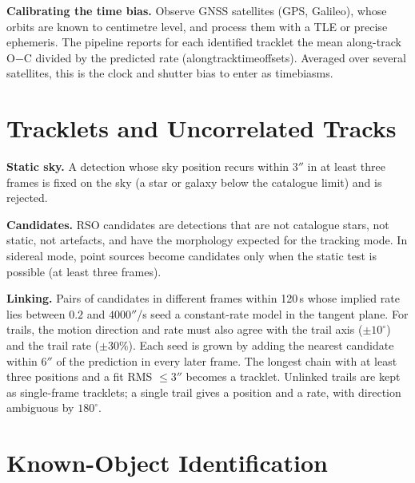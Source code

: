 \documentclass[11pt,a4paper]{article}
\newcommand{\brkus}{\textunderscore\allowbreak}
\newcommand{\code}[1]{{\ttfamily\let\_\brkus #1}}
\begin{document}
\begin{notebox}
\textbf{Calibrating the time bias.} Observe GNSS satellites (GPS, Galileo), whose orbits are
known to centimetre level, and process them with a TLE or precise ephemeris. The pipeline
reports for each identified tracklet the mean along-track O$-$C divided by the predicted rate
(\code{along\_track\_time\_offset\_s}). Averaged over several satellites, this is the clock and
shutter bias to enter as \code{time\_bias\_ms}.
\end{notebox}

\section{Tracklets and Uncorrelated Tracks}

\textbf{Static sky.} A detection whose sky position recurs within $3''$ in at least three frames
is fixed on the sky (a star or galaxy below the catalogue limit) and is rejected.

\textbf{Candidates.} RSO candidates are detections that are not catalogue stars, not static,
not artefacts, and have the morphology expected for the tracking mode. In sidereal mode, point
sources become candidates only when the static test is possible (at least three frames).

\textbf{Linking.} Pairs of candidates in different frames within 120\,s whose implied rate lies
between $0.2$ and $4000''$/s seed a constant-rate model in the tangent plane. For trails, the
motion direction and rate must also agree with the trail axis ($\pm10^\circ$) and the trail
rate ($\pm30\%$). Each seed is grown by adding the nearest candidate within $6''$ of the
prediction in every later frame. The longest chain with at least three positions and a fit RMS
$\leq 3''$ becomes a tracklet. Unlinked trails are kept as single-frame tracklets; a single trail
gives a position and a rate, with direction ambiguous by $180^\circ$.

\section{Known-Object Identification}
\end{document}
